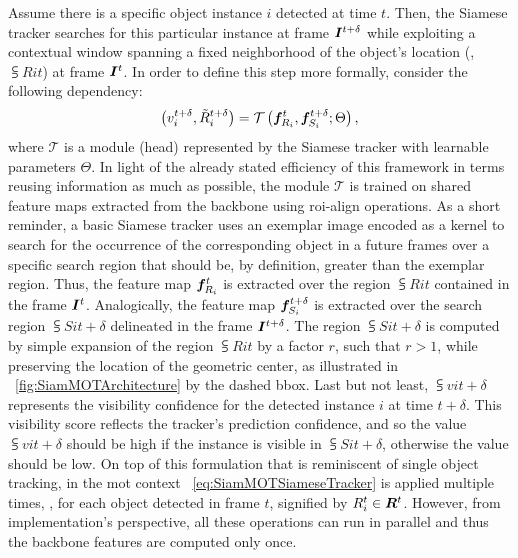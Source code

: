 Assume there is a specific object instance $i$ detected at time $t$. Then, the Siamese tracker searches for this particular instance at frame $\bm{I}^{t + \delta}$ while exploiting a contextual window spanning a fixed neighborhood of the object's location (\ietext{}, $\subsup{R}{i}{t}$) at frame $\bm{I}^{t}$. In order to define this step more formally, consider the following dependency:
\begin{equation}
    \label{eq:SiamMOTSiameseTracker}
    \left( {
        {v}_{i}^{t + \delta},
        {\tilde{R}}_{i}^{t + \delta}
    } \right) =
    {\mathcal{T}} \left( 
        \bm{f}_{R_i}^{t}, \bm{f}_{S_i}^{t + \delta}; \Theta
     \right),
\end{equation}
where $\mathcal{T}$ is a module (head) represented by the Siamese tracker with learnable parameters $\Theta$. In light of the already stated efficiency of this framework in terms reusing information as much as possible, the module $\mathcal{T}$ is trained on shared feature maps extracted from the backbone using \gls{roi}-align operations. As a short reminder, a basic Siamese tracker uses an exemplar image encoded as a kernel to search for the occurrence of the corresponding object in a future frames over a specific search region that should be, by definition, greater than the exemplar region. Thus, the feature map $\bm{f}_{R_i}^{t}$ is extracted over the region $\subsup{R}{i}{t}$ contained in the frame $\bm{I}^{t}$. Analogically, the feature map $\bm{f}_{S_i}^{t + \delta}$ is extracted over the search region $\subsup{S}{i}{t + \delta}$ delineated in the frame $\bm{I}^{t + \delta}$. The region $\subsup{S}{i}{t + \delta}$ is computed by simple expansion of the region $\subsup{R}{i}{t}$ by a factor $r$, such that $r > 1$, while preserving the location of the geometric center, as illustrated in \figtext{}~\ref{fig:SiamMOTArchitecture} by the dashed \gls{bbox}. Last but not least, $\subsup{v}{i}{t + \delta}$ represents the visibility confidence for the detected instance $i$ at time $t + \delta$. This visibility score reflects the tracker's prediction confidence, and so the value $\subsup{v}{i}{t + \delta}$ should be high if the instance is visible in $\subsup{S}{i}{t + \delta}$, otherwise the value should be low. On top of this formulation that is reminiscent of single object tracking, in the \gls{mot} context \eqtext{}~\ref{eq:SiamMOTSiameseTracker} is applied multiple times, \ietext{}, for each object detected in frame $t$, signified by ${R}_{i}^{t} \in \bm{R}^{t}$. However, from implementation's perspective, all these operations can run in parallel and thus the backbone features are computed only once.

